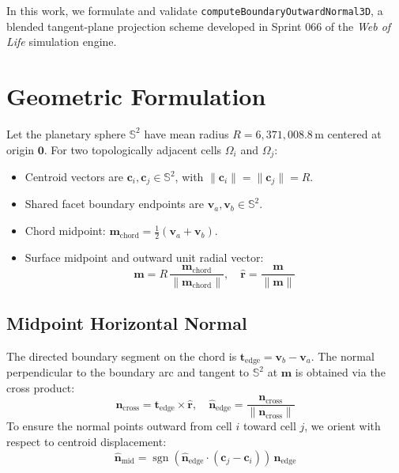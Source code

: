 \documentclass[11pt,a4paper]{article}
\theoremstyle{definition}
\begin{document}
In this work, we formulate and validate \texttt{computeBoundaryOutwardNormal3D}, a blended tangent-plane projection scheme developed in Sprint 066 of the \textit{Web of Life} simulation engine.

\section{Geometric Formulation}

Let the planetary sphere $\mathbb{S}^2$ have mean radius $R = 6{,}371{,}008.8\,\text{m}$ centered at origin $\mathbf{0}$. For two topologically adjacent cells $\Omega_i$ and $\Omega_j$:
\begin{itemize}
    \item Centroid vectors are $\mathbf{c}_i, \mathbf{c}_j \in \mathbb{S}^2$, with $\|\mathbf{c}_i\| = \|\mathbf{c}_j\| = R$.
    \item Shared facet boundary endpoints are $\mathbf{v}_a, \mathbf{v}_b \in \mathbb{S}^2$.
    \item Chord midpoint: $\mathbf{m}_{\text{chord}} = \frac{1}{2}(\mathbf{v}_a + \mathbf{v}_b)$.
    \item Surface midpoint and outward unit radial vector:
    \begin{equation}
        \mathbf{m} = R\,\frac{\mathbf{m}_{\text{chord}}}{\|\mathbf{m}_{\text{chord}}\|}, \quad \hat{\mathbf{r}} = \frac{\mathbf{m}}{\|\mathbf{m}\|}
    \end{equation}
\end{itemize}

\subsection{Midpoint Horizontal Normal}
The directed boundary segment on the chord is $\mathbf{t}_{\text{edge}} = \mathbf{v}_b - \mathbf{v}_a$. The normal perpendicular to the boundary arc and tangent to $\mathbb{S}^2$ at $\mathbf{m}$ is obtained via the cross product:
\begin{equation}
    \mathbf{n}_{\text{cross}} = \mathbf{t}_{\text{edge}} \times \hat{\mathbf{r}}, \quad \hat{\mathbf{n}}_{\text{edge}} = \frac{\mathbf{n}_{\text{cross}}}{\|\mathbf{n}_{\text{cross}}\|}
\end{equation}
To ensure the normal points outward from cell $i$ toward cell $j$, we orient with respect to centroid displacement:
\begin{equation}
    \hat{\mathbf{n}}_{\text{mid}} = \operatorname{sgn}\left(\hat{\mathbf{n}}_{\text{edge}} \cdot (\mathbf{c}_j - \mathbf{c}_i)\right)\,\hat{\mathbf{n}}_{\text{edge}}
\end{equation}
\end{document}
